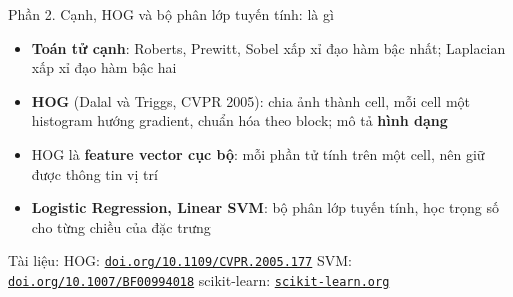 \documentclass[aspectratio=169,10pt]{beamer}
\begin{document}
\begin{frame}{Phần 2. Cạnh, HOG và bộ phân lớp tuyến tính: là gì}
\begin{itemize}
\item \textbf{Toán tử cạnh}: Roberts, Prewitt, Sobel xấp xỉ đạo hàm bậc nhất; Laplacian xấp xỉ đạo hàm bậc hai
\item \textbf{HOG} (Dalal và Triggs, CVPR 2005): chia ảnh thành cell, mỗi cell một histogram hướng gradient, chuẩn hóa theo block; mô tả \textbf{hình dạng}
\item HOG là \textbf{feature vector cục bộ}: mỗi phần tử tính trên một cell, nên giữ được thông tin vị trí
\item \textbf{Logistic Regression, Linear SVM}: bộ phân lớp tuyến tính, học trọng số cho từng chiều của đặc trưng
\end{itemize}
\vfill{\scriptsize\color{uitgray}Tài liệu: HOG: \href{https://doi.org/10.1109/CVPR.2005.177}{\texttt{doi.org/10.1109/CVPR.2005.177}} \textbar{} SVM: \href{https://doi.org/10.1007/BF00994018}{\texttt{doi.org/10.1007/BF00994018}} \textbar{} scikit-learn: \href{https://scikit-learn.org}{\texttt{scikit-learn.org}}}
\end{frame}
\end{document}
